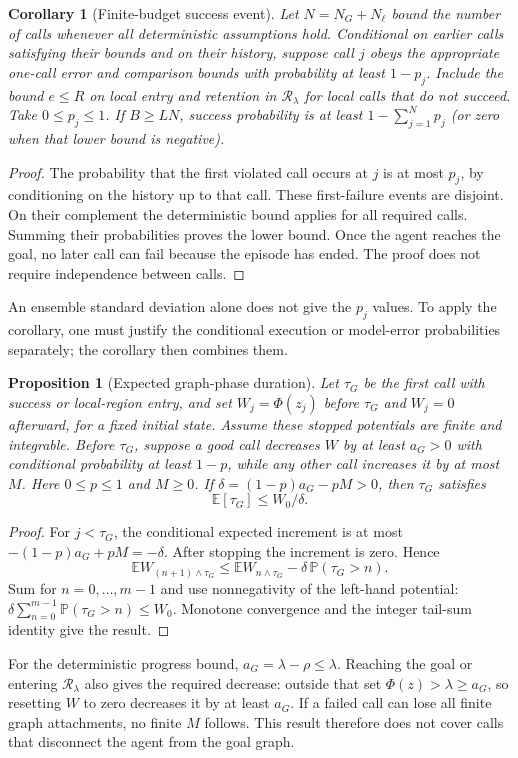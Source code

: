 \documentclass{article}
\newcommand{\Rset}{\mathcal R_\lambda}
\newcommand{\EE}{\mathbb E}
\newcommand{\PP}{\mathbb P}
\newtheorem{proposition}[theorem]{Proposition}
\newtheorem{corollary}[theorem]{Corollary}
\theoremstyle{definition}
\theoremstyle{remark}
\begin{document}
\begin{corollary}[Finite-budget success event]
\label{cor:high-prob}
Let $N=N_G+N_\ell$ bound the number of calls whenever all deterministic assumptions hold.
Conditional on earlier calls satisfying their bounds and on their history, suppose
call $j$ obeys the appropriate one-call error and comparison bounds with probability
at least $1-p_j$. Include the bound $e\le R$ on local entry and retention in $\Rset$
for local calls that do not succeed. Take $0\le p_j\le1$.
If $B\ge LN$, success probability is at least
$1-\sum_{j=1}^{N}p_j$ (or zero when that lower bound is negative).
\end{corollary}
\begin{proof}
The probability that the first violated call occurs at $j$ is at most $p_j$,
by conditioning on the history up to that call.
These first-failure events are disjoint. On their complement the deterministic
bound applies for all required calls. Summing their probabilities proves
the lower bound. Once the agent reaches the goal, no later call can fail because the
episode has ended. The proof does not require independence between calls.
\end{proof}
An ensemble standard deviation alone does not give the $p_j$ values.
To apply the corollary, one must justify the conditional execution or model-error
probabilities separately; the corollary then combines them.

\begin{proposition}[Expected graph-phase duration]
\label{prop:drift}
Let $\tau_G$ be the first call with success or local-region entry, and set
$W_j=\Phi(z_j)$ before $\tau_G$ and $W_j=0$ afterward, for a fixed initial state.
Assume these stopped potentials are finite and integrable.
Before $\tau_G$, suppose a good call decreases $W$ by at least $a_G>0$ with conditional
probability at least $1-p$, while any other call increases it by at most $M$.
Here $0\le p\le1$ and $M\ge0$.
If $\delta=(1-p)a_G-pM>0$, then $\tau_G$ satisfies
\[
 \EE[\tau_G]\le W_0/\delta.
\]
\end{proposition}
\begin{proof}
For $j<\tau_G$, the conditional expected increment is at most
$-(1-p)a_G+pM=-\delta$. After stopping the increment is zero. Hence
\[
 \EE W_{(n+1)\wedge\tau_G}
 \le \EE W_{n\wedge\tau_G}-\delta\,\PP(\tau_G>n).
\]
Sum for $n=0,\ldots,m-1$ and use nonnegativity of the left-hand potential:
$\delta\sum_{n=0}^{m-1}\PP(\tau_G>n)\le W_0$.
Monotone convergence and the integer tail-sum identity give the result.
\end{proof}
For the deterministic progress bound, $a_G=\lambda-\rho\le\lambda$.
Reaching the goal or entering $\Rset$ also gives the required decrease: outside that set
$\Phi(z)>\lambda\ge a_G$, so resetting $W$ to zero decreases it by at least $a_G$.
If a failed call can lose all finite graph attachments, no finite $M$ follows.
This result therefore does not cover calls that disconnect the agent from the goal graph.
\end{document}
